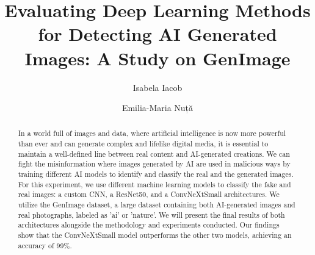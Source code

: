 \documentclass[runningheads]{llncs}
\begin{document}
%
\title{Evaluating Deep Learning Methods for Detecting AI Generated Images: A Study on GenImage}
%
%
\author{Isabela Iacob \and Emilia-Maria Nuță}
%
%
%
\maketitle              %
%
\begin{abstract}

In a world full of images and data, where artificial intelligence is now more powerful than ever and can generate complex and lifelike digital media, it is essential to maintain a well-defined line between real content and AI-generated creations. We can fight the misinformation where images generated by AI are used in malicious ways by training different AI models to identify and classify the real and the generated images. For this experiment, we use different machine learning models to classify the fake and real images: a custom CNN, a ResNet50, and a ConvNeXtSmall architectures.
We utilize the GenImage dataset, a large dataset containing both AI-generated images and real photographs, labeled as 'ai' or 'nature'.  We will present the final results of both architectures alongside the methodology and experiments conducted. Our findings show that the ConvNeXtSmall model outperforms the other two models, achieving an accuracy of 99\%.

\end{abstract}
%
%
\end{document}

